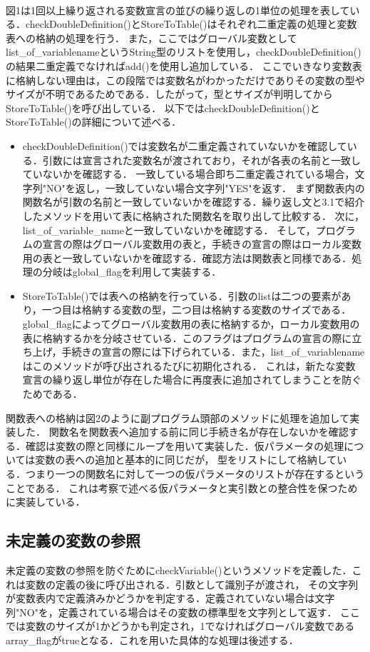 \documentclass[dvipdfmx]{jarticle}
\begin{document}
  \\図1は1回以上繰り返される変数宣言の並びの繰り返しの1単位の処理を表している．checkDoubleDefinition()とStoreToTable()はそれぞれ二重定義の処理と変数表への格納の処理を行う．
また，ここではグローバル変数としてlist\_of\_variablenameというString型のリストを使用し，checkDoubleDefinition()の結果二重定義でなければadd()を使用し追加している．
ここでいきなり変数表に格納しない理由は，この段階では変数名がわかっただけでありその変数の型やサイズが不明であるためである．したがって，型とサイズが判明してからStoreToTable()を呼び出している．
以下ではcheckDoubleDefinition()とStoreToTable()の詳細について述べる．
\begin{itemize}
  \item checkDoubleDefinition()では変数名が二重定義されていないかを確認している．引数には宣言された変数名が渡されており，それが各表の名前と一致していないかを確認する．
  一致している場合即ち二重定義されている場合，文字列"NO"を返し，一致していない場合文字列"YES"を返す．
  まず関数表内の関数名が引数の名前と一致していないかを確認する．繰り返し文と3.1で紹介したメソッドを用いて表に格納された関数名を取り出して比較する．
  次に，list\_of\_variable\_nameと一致していないかを確認する．
  そして，プログラムの宣言の際はグローバル変数用の表と，手続きの宣言の際はローカル変数用の表と一致していないかを確認する．確認方法は関数表と同様である．処理の分岐はglobal\_flagを利用して実装する．
  \item StoreToTable()では表への格納を行っている．引数のlistは二つの要素があり，一つ目は格納する変数の型，二つ目は格納する変数のサイズである．
  global\_flagによってグローバル変数用の表に格納するか，ローカル変数用の表に格納するかを分岐させている．このフラグはプログラムの宣言の際に立ち上げ，手続きの宣言の際には下げられている．また，list\_of\_variablenameはこのメソッドが呼び出されるたびに初期化される．
  これは，新たな変数宣言の繰り返し単位が存在した場合に再度表に追加されてしまうことを防ぐためである．
\end{itemize}
関数表への格納は図2のように副プログラム頭部のメソッドに処理を追加して実装した．
関数名を関数表へ追加する前に同じ手続き名が存在しないかを確認する．確認は変数の際と同様にループを用いて実装した．仮パラメータの処理については変数の表への追加と基本的に同じだが，
型をリストにして格納している．つまり一つの関数名に対して一つの仮パラメータのリストが存在するということである．
これは考察で述べる仮パラメータと実引数との整合性を保つために実装している．
\subsection{未定義の変数の参照}
未定義の変数の参照を防ぐためにcheckVariable()というメソッドを定義した．これは変数の定義の後に呼び出される．引数として識別子が渡され，
その文字列が変数表内で定義済みかどうかを判定する．定義されていない場合は文字列"NO"を，定義されている場合はその変数の標準型を文字列として返す．
ここでは変数のサイズが1かどうかも判定され，1でなければグローバル変数であるarray\_flagがtrueとなる．これを用いた具体的な処理は後述する．
\end{document}
